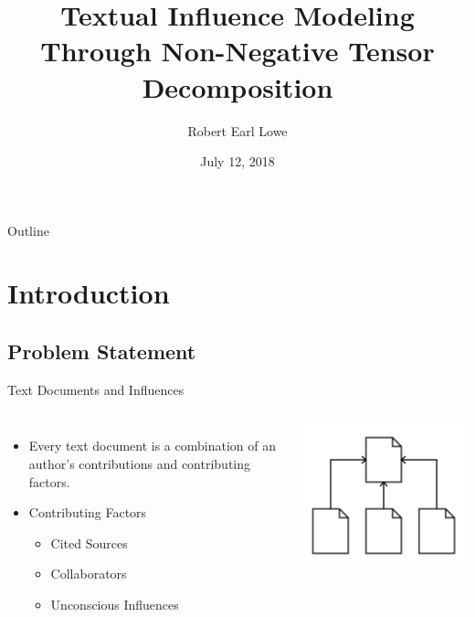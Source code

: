 \documentclass[handout]{beamer}
\title[Textual Influence Modeling]{Textual Influence Modeling Through Non-Negative Tensor Decomposition}
\author{Robert Earl Lowe}
\date[]{July 12, 2018}
\begin{document}

\begin{frame}
  \titlepage
\end{frame}

\begin{frame}{Outline}
  \tableofcontents
\end{frame}

\section{Introduction}
\subsection{Problem Statement}
\begin{frame}{Text Documents and Influences}
\begin{columns}
\begin{itemize}[<+->]
  \item Every text document is a combination of an author's contributions and contributing factors.
  \item Contributing Factors
  \begin{itemize}
    \item Cited Sources
    \item Collaborators
    \item Unconscious Influences
  \end{itemize}
\end{itemize}
\includegraphics[width=\textwidth]{images/Citations}
\end{columns}
\end{frame}
\end{document}
